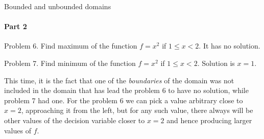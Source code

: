 \documentclass{beamer}
\begin{document}
\begin{frame}{Bounded and unbounded domains}
	\framesubtitle{Part 2}
	\begin{flushleft}
		
		Problem 6. Find maximum of the function $f = x^2$ if $1 \leq x < 2$. It has no solution.
		
		\bigskip
		
		Problem 7. Find minimum of the function $f = x^2$ if $1 \leq x < 2$. Solution is $x = 1$.
		
		\bigskip
		
		This time, it is the fact that one of the \emph{boundaries} of the domain was not included in the domain that has lead the problem 6 to have no solution, while problem 7 had one. For the problem 6 we can pick a value arbitrary close to $x = 2$, approaching it from the left, but for any such value, there always will be other values of the decision variable closer to $x = 2$ and hence producing larger values of $f$.
		
	\end{flushleft}
\end{frame}
\end{document}
